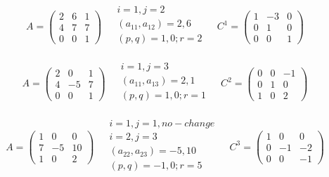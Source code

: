 \begin{example}


\[
A= \left(\begin{matrix}
	2 & 6 & 1 \\
	4 & 7 & 7 \\
	0 & 0 & 1
\end{matrix}\right) \;\;\;\;
\begin{matrix}
	i=1, j=2 \\
	(a_{11}, a_{12}) = 2, 6 \\
	(p, q) = 1, 0; r=2 \\
\end{matrix}  \;\;\;\;
C^1= \left(\begin{matrix}
	1 & -3 & 0 \\
	0 & 1 & 0 \\
	0 & 0 & 1
\end{matrix}\right)
\]


\[
A= \left(\begin{matrix}
	2 & 0 & 1 \\
	4 &-5 & 7 \\
	0 & 0 & 1
\end{matrix}\right) \;\;\;\;
\begin{matrix}
	i=1, j=3 \\
	(a_{11}, a_{13}) = 2, 1 \\
	(p, q) = 1, 0; r=1 \\
\end{matrix}  \;\;\;\;
C^2= \left(\begin{matrix}
	0 & 0 & -1 \\
	0 & 1 & 0 \\
	1 & 0 & 2
\end{matrix}\right)
\]

\[
A= \left(\begin{matrix}
	1 & 0 & 0 \\
	7 & -5 & 10 \\
	1 & 0 & 2
\end{matrix}\right) \;\;\;\;
\begin{matrix}
	i=1, j=1, no-change \\
	i=2, j=3 \\
	(a_{22}, a_{23}) = -5, 10 \\
	(p, q) = -1, 0; r=5 \\
\end{matrix}  \;\;\;\;
C^3= \left(\begin{matrix}
	1 & 0 & 0 \\
	0 & -1 & -2 \\
	0 & 0 & -1
\end{matrix}\right)
\]


\end{example}
